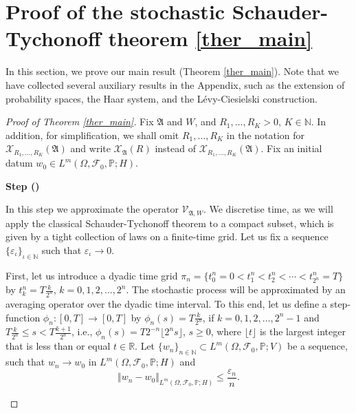 \documentclass[english,a4paper,11pt]{amsart}
\theoremstyle{plain}
\theoremstyle{definition}
\theoremstyle{remark}
\numberwithin{equation}{section}
\newcounter{lil1}
\newenvironment{step}
{\begin{list} { \bf Step (\Roman{lil1})}
		{ \usecounter{lil1}
			\setlength{\leftmargin}{0.0cm}
			\setlength{\topsep}{0.2cm}
			\setlength{\itemsep}{0.0cm}
			\setlength{\parsep}{0.1cm}
			\setlength{\itemindent}{0.8cm}
			\setlength{\parskip}{0.0cm}}}
	{\end{list}}
\newcounter{lil33}
\newcounter{lil1q}
\newcommand{\ep} {\varepsilon }
\newcommand{\NN}{\mathbb{N}}
\newcommand{\Fcal} {{\mathcal F}}
\newcommand{\Xcal} {{\mathcal X}}
\newcommand{\Afrak} {{\mathfrak A}}
\newcommand{\N}{\mathbb{N}}
\begin{document}
\section{Proof of the stochastic Schauder-Tychonoff theorem \ref{ther_main}}\label{sec:proof_of_schauder}


In this section, we prove our main result (Theorem \ref{ther_main}). Note that we have collected several auxiliary results in
the Appendix, such as the extension of probability spaces, the Haar system, and the L\'evy-Ciesielski construction. 
\begin{proof}[Proof of Theorem \ref{ther_main}]

Fix
$\Afrak$ and $W$, and $R_1,\ldots,R_K>0$, $K\in\N$. In addition, for simplification, we shall omit $R_1,\ldots,R_K$ in the notation for $ \Xcal_{R_1,\ldots,R_K}(\Afrak)$ and write $ \Xcal_{\Afrak}(R)$ instead of $ \Xcal_{R_1,\ldots,R_K}(\Afrak)$. Fix an initial datum $w_0\in L^m(\Omega,\Fcal_0,\mathbb{P};H)$.

\begin{step}
\item In this step we approximate the operator $\mathcal{V}_{\Afrak,W}$. We discretise time, as we will apply the classical Schauder-Tychonoff theorem to a compact subset, which is given by a tight collection of laws on a finite-time grid. 
Let us fix a sequence $\{\ep_\iota\}_{\iota\in\N}$ such that $\ep_\iota\to 0$.



First, let us introduce a dyadic time grid $\pi_n=\{t^n_0=0<t^n_1<t^n_2<\cdots <t^n_{2^n}=T\}$
by $t^n_k= T\frac{k}{ 2^n}$, $k=0,1,2,\ldots,2^n$.
The stochastic process will be approximated by an averaging operator over the dyadic time interval.
To this end, let us define a step-function
$\phi_n:[0,T]\to[0,T]$ by $\phi_n(s)=T\frac{k}{ 2^n}$, if
$k=0,1,2,\ldots,2^n-1$ and $T\frac{k}{ 2^n}\le s<T\frac{k+1}{2^n}$, i.e.,
$\phi_n(s)= T2 ^ {-n}\lfloor 2 ^ ns\rfloor$, $s\ge 0$, where $\lfloor t\rfloor$ is the largest
integer that is less than or equal $t\in \mathbb{R}$. Let $\{w_n\}_{n\in\NN}\subset L^m(\Omega,\Fcal_0,\mathbb{P};V)$ be a sequence, such that $w_n\to w_0$ in $L^m(\Omega,\Fcal_0,\mathbb{P};H)$ and $$\Vert w_n-w_0\Vert_{L^m(\Omega,\Fcal_0,\mathbb{P};H)}\le \frac {\ep_n}n.$$


\end{step}
\end{proof}
\end{document}
